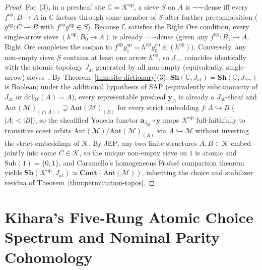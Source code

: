 \documentclass[10pt,twoside,openright]{book}
\theoremstyle{crmplain}
\theoremstyle{crmdef}
\theoremstyle{crmremark}
\begin{document}
\begin{proof}
For~(3), in a presheaf site $\mathbb{C} = \mathcal{K}^{\mathrm{op}}$, a sieve $S$ on $A$ is $\neg\neg$-dense iff every $f^{\mathrm{op}} : B \to A$ in $\mathbb{C}$ factors through some member of $S$ after further precomposition ($g^{\mathrm{op}} : C \to B$ with $f^{\mathrm{op}} g^{\mathrm{op}} \in S$). Because $\mathbb{C}$ satisfies the Right Ore condition, every single-arrow sieve $(h^{\mathrm{op}} : B_0 \to A)$ is already $\neg\neg$-dense (given any $f^{\mathrm{op}} : B_1 \to A$, Right Ore completes the cospan to $f^{\mathrm{op}} g_1^{\mathrm{op}} = h^{\mathrm{op}} g_0^{\mathrm{op}} \in (h^{\mathrm{op}})$). Conversely, any non-empty sieve $S$ contains at least one arrow $h^{\mathrm{op}}$, so $J_{\neg\neg}$ coincides identically with the atomic topology $J_{\mathrm{at}}$ generated by all non-empty (equivalently, single-arrow) sieves~\cite[\S C2.2, \S A4.6]{Johnstone02}. By Theorem~\ref{thm:site-dictionary}(3), $\mathbf{Sh}(\mathbb{C}, J_{\mathrm{at}}) = \mathbf{Sh}(\mathbb{C}, J_{\neg\neg})$ is Boolean; under the additional hypothesis of $\mathrm{SAP}$ (equivalently subcanonicity of $J_{\mathrm{at}}$ or $\mathrm{dcl}_{\mathcal{M}}(A) = A$), every representable presheaf $\mathbf{y}_A$ is already a $J_{\mathrm{at}}$-sheaf and $\mathrm{Aut}(\mathcal{M})_{(f(A))} \supsetneq \mathrm{Aut}(\mathcal{M})_{(B)}$ for every strict embedding $f : A \hookrightarrow B$ ($|A| < |B|$), so the sheafified Yoneda functor $\mathbf{a}_{J_{\mathrm{at}}} \circ \mathbf{y}$ maps $\mathcal{K}^{\mathrm{op}}$ full-faithfully to transitive coset orbits $\mathrm{Aut}(\mathcal{M})/\mathrm{Aut}(\mathcal{M})_{(A)}$ via $A \hookrightarrow \mathcal{M}$ without inverting the strict embeddings of $\mathcal{K}$. By $\mathrm{JEP}$, any two finite structures $A, B \in \mathcal{K}$ embed jointly into some $C \in \mathcal{K}$, so the unique non-empty sieve on $1$ is atomic and $\mathrm{Sub}(1) = \{0, 1\}$, and Caramello's homogeneous Fra\"iss\'e comparison theorem~\cite{Caramello18} yields $\mathbf{Sh}(\mathcal{K}^{\mathrm{op}}, J_{\mathrm{at}}) \simeq \mathbf{Cont}(\mathrm{Aut}(\mathcal{M}))$, inheriting the choice and stabilizer residua of Theorem~\ref{thm:permutation-topos}.
\end{proof}

\section{\texorpdfstring{Kihara's Five-Rung Atomic Choice Spectrum and Nominal Parity Cohomology}{Kihara's Five-Rung Atomic Choice Spectrum and Nominal Parity Cohomology}}\label{subsec:kihara-choice-nominal}
\end{document}

